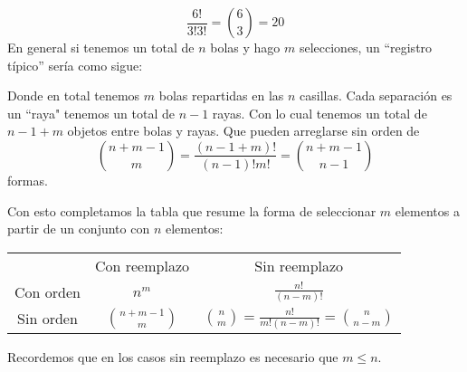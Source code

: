 \documentclass[14pt]{extreport}
\theoremstyle{definicion}
\theoremstyle{propiedad}
\begin{document}
$$
\frac{6!}{3!3!} = \binom{6}{3} = 20
$$ 
En general si tenemos un total de $n$ bolas y hago $m$ selecciones, un ``registro típico'' sería como sigue:
\begin{center}
\end{center}
 Donde en total tenemos $m$ bolas repartidas en las $n$ casillas. Cada separación es un ``raya" tenemos un total de $n - 1$ rayas. Con lo cual tenemos un total de $n - 1 + m$ objetos entre bolas y rayas. Que pueden arreglarse sin orden de 
 $$
 \binom{n+m-1}{m}=\frac{(n-1+m)!}{(n-1)!m!} = \binom{n+m-1}{n-1}
 $$
 formas.

Con esto completamos la tabla que resume la forma de seleccionar $m$ elementos a partir de un conjunto con $n$ elementos: 

\begin{center}
  \begin{table}[h]
    \begin{tabular}{c|c|c|}
      \multicolumn{1}{c}{}           & \multicolumn{1}{c}{Con reemplazo} & \multicolumn{1}{c}{Sin reemplazo}                   \\[0.5ex] \cline{2-3}
      \multicolumn{1}{c|}{Con orden} & $n^m$                             & $\frac{n!}{(n-m)!}$                                 \\[0.5ex]\cline{2-3}
      \multicolumn{1}{c|}{Sin orden} & $\binom{n+m-1}{m}$                                 & $\binom{n}{m} = \frac{n!}{m!(n-m)!}=\binom{n}{n-m}$ \\\cline{2-3}
    \end{tabular}
  \end{table}
\end{center}
Recordemos que en los casos sin reemplazo es necesario que $m \leq n$.
\end{document}
